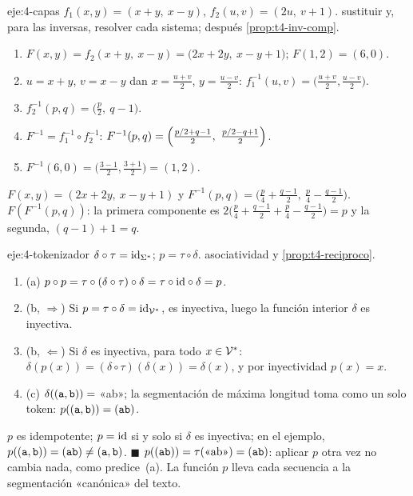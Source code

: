 \begin{solucion}{eje:4-capas}
\datos $f_1(x,y)=(x+y,\ x-y)$, $f_2(u,v)=(2u,\ v+1)$.
\planteamiento sustituir y, para las inversas, resolver cada sistema; después \cref{prop:t4-inv-comp}.
\pasos
\begin{enumerate}[label=\arabic*.]
  \item $F(x,y)=f_2(x+y,\ x-y)=\bigl(2x+2y,\ x-y+1\bigr)$; $F(1,2)=(6,0)$.
  \item $u=x+y$, $v=x-y$ dan $x=\tfrac{u+v}{2}$, $y=\tfrac{u-v}{2}$: $f_1^{-1}(u,v)=\bigl(\tfrac{u+v}{2},\tfrac{u-v}{2}\bigr)$.
  \item $f_2^{-1}(p,q)=\bigl(\tfrac p2,\ q-1\bigr)$.
  \item $F^{-1}=f_1^{-1}\circ f_2^{-1}$: $F^{-1}(p,q)=\Bigl(\tfrac{p/2+q-1}{2},\ \tfrac{p/2-q+1}{2}\Bigr)$.
  \item $F^{-1}(6,0)=\bigl(\tfrac{3-1}{2},\tfrac{3+1}{2}\bigr)=(1,2)$.
\end{enumerate}
\resultado $F(x,y)=(2x+2y,\ x-y+1)$ y $F^{-1}(p,q)=\bigl(\tfrac p4+\tfrac{q-1}{2},\ \tfrac p4-\tfrac{q-1}{2}\bigr)$.
\comprobacion $F(F^{-1}(p,q))$: la primera componente es $2\bigl(\tfrac p4+\tfrac{q-1}2+\tfrac p4-\tfrac{q-1}2\bigr)=p$ y la segunda, $(q-1)+1=q$.
\end{solucion}

\begin{solucion}{eje:4-tokenizador}
\datos $\delta\circ\tau=\mathrm{id}_{\Sigma^{*}}$; $p=\tau\circ\delta$.
\planteamiento asociatividad y \cref{prop:t4-reciproco}.
\pasos
\begin{enumerate}[label=\arabic*.]
  \item (a) $p\circ p=\tau\circ(\delta\circ\tau)\circ\delta=\tau\circ\mathrm{id}\circ\delta=p$.
  \item (b, $\Rightarrow$) Si $p=\tau\circ\delta=\mathrm{id}_{\mathcal{V}^{*}}$, es inyectiva, luego la función interior $\delta$ es inyectiva.
  \item (b, $\Leftarrow$) Si $\delta$ es inyectiva, para todo $x\in\mathcal{V}^{*}$: $\delta(p(x))=(\delta\circ\tau)(\delta(x))=\delta(x)$, y por inyectividad $p(x)=x$.
  \item (c) $\delta((\texttt{a},\texttt{b}))=$ «ab»; la segmentación de máxima longitud toma  como un solo token: $p((\texttt{a},\texttt{b}))=(\texttt{ab})$.
\end{enumerate}
\resultado $p$ es idempotente; $p=\mathrm{id}$ si y solo si $\delta$ es inyectiva; en el ejemplo, $p((\texttt{a},\texttt{b}))=(\texttt{ab})\neq(\texttt{a},\texttt{b})$. \hfill$\blacksquare$
\comprobacion $p((\texttt{ab}))=\tau(\text{«ab»})=(\texttt{ab})$: aplicar $p$ otra vez no cambia nada, como predice~(a). La función $p$ lleva cada secuencia a la segmentación «canónica» del texto.
\end{solucion}
